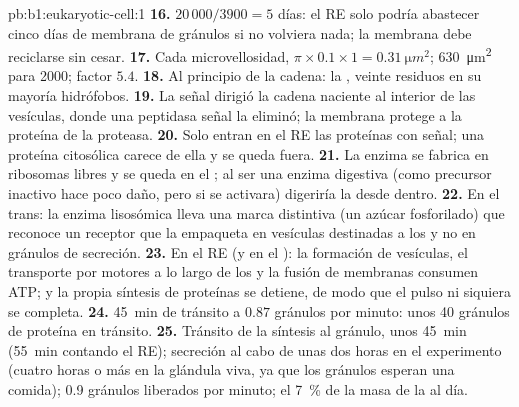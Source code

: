 \begin{solution}{pb:b1:eukaryotic-cell:1}
\textbf{16.} $20\,000/3900 = 5$ días: el RE solo podría abastecer cinco días
de membrana de gránulos si no volviera nada; la membrana debe reciclarse sin
cesar.
\textbf{17.} Cada microvellosidad, $\pi\times 0.1\times 1 =
\qty{0.31}{\micro m^2}$; \qty{630}{\micro m^2} para 2000; factor $5.4$.
\textbf{18.} Al principio de la cadena: la , veinte residuos
en su mayoría hidrófobos.
\textbf{19.} La señal dirigió la cadena naciente al interior de las
vesículas, donde una peptidasa señal la eliminó; la membrana protege a la
proteína de la proteasa.
\textbf{20.} Solo entran en el RE las proteínas con señal; una proteína
citosólica carece de ella y se queda fuera.
\textbf{21.} La enzima se fabrica en ribosomas libres y se queda en el
; al ser una enzima digestiva (como precursor inactivo hace poco
daño, pero si se activara) digeriría la  desde dentro.
\textbf{22.} En el  trans: la enzima lisosómica lleva una marca
distintiva (un azúcar fosforilado) que reconoce un receptor que la empaqueta
en vesículas destinadas a los  y no en gránulos de secreción.
\textbf{23.} En el RE (y en el ): la formación de vesículas, el
transporte por motores a lo largo de los  y la fusión de
membranas consumen ATP; y la propia síntesis de proteínas se detiene, de
modo que el pulso ni siquiera se completa.
\textbf{24.} \qty{45}{min} de tránsito a $0.87$ gránulos por minuto: unos
\qty{40}{} gránulos de proteína en tránsito.
\textbf{25.} Tránsito de la síntesis al gránulo, unos \qty{45}{min}
(\qty{55}{min} contando el RE); secreción al cabo de unas dos horas en el
experimento (cuatro horas o más en la glándula viva, ya que los gránulos
esperan una comida); \qty{0.9}{} gránulos liberados por minuto; el
\qty{7}{\%} de la masa de la  al día.
\end{solution}
